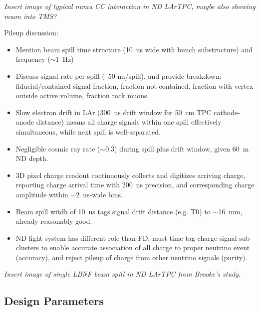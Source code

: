 {\it Insert image of typical numu CC interaction in ND LArTPC, maybe also showing muon into TMS?}

Pileup discussion:
\begin{itemize}
    \item Mention beam spill time structure (10~us wide with bunch substructure) and frequency ($\sim$1~Hz)
    \item Discuss signal rate per spill (~50 nu/spill), and provide breakdown: fiducial/contained signal fraction, fraction not contained, fraction with vertex outside active volume, fraction rock muons.
    \item Slow electron drift in LAr (300~us drift window for 50~cm TPC cathode-anode distance) means all charge signals within one spill effectively simultaneous, while next spill is well-separated.
    \item Negligible cosmic ray rate ($\sim$0.3) during spill plus drift window, given 60~m ND depth.
    \item 3D pixel charge readout continuously collects and digitizes arriving charge, reporting charge arrival time with 200~ns precision, and corresponding charge amplitude within $\sim$2~us-wide bins.
    \item Beam spill witdh of 10~us tags signal drift distance (e.g. T0) to $\sim$16~mm, already reasonably good.  
    \item ND light system has different role than FD; must time-tag charge signal sub-clusters to enable accurate association of all charge to proper neutrino event (accuracy), and reject pileup of charge from other neutrino signals (purity).
\end{itemize}

{\it Insert image of single LBNF beam spill in ND LArTPC from Brooke's study.}

\subsection{Design Parameters}
\label{sec:lartpc-ovvw-param}

